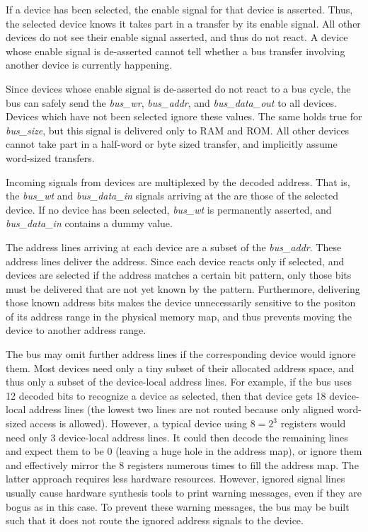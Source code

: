 If a device has been selected, the enable signal for that device is asserted. Thus, the selected device knows it takes part in a transfer by its enable signal. All other devices do not see their enable signal asserted, and thus do not react. A device whose enable signal is de-asserted cannot tell whether a bus transfer involving another device is currently happening.

Since devices whose enable signal is de-asserted do not react to a bus cycle, the bus can safely send the {\it bus\_wr}, {\it bus\_addr}, and {\it bus\_data\_out} to all devices. Devices which have not been selected ignore these values. The same holds true for {\it bus\_size}, but this signal is delivered only to RAM and ROM. All other devices cannot take part in a half-word or byte sized transfer, and implicitly assume word-sized transfers.

Incoming signals from devices are multiplexed by the decoded address. That is, the {\it bus\_wt} and {\it bus\_data\_in} signals arriving at the \eco are those of the selected device. If no device has been selected, {\it bus\_wt} is permanently asserted, and {\it bus\_data\_in} contains a dummy value.

The address lines arriving at each device are a subset of the {\it bus\_addr}. These address lines deliver the  address. Since each device reacts only if selected, and devices are selected if the address matches a certain bit pattern, only those bits must be delivered that are not yet known by the pattern. Furthermore, delivering those known address bits makes the device unnecessarily sensitive to the positon of its address range in the physical memory map, and thus prevents moving the device to another address range.

The bus may omit further address lines if the corresponding device would ignore them. Most devices need only a tiny subset of their allocated address space, and thus only a subset of the device-local address lines. For example, if the bus uses 12 decoded bits to recognize a device as selected, then that device gets 18 device-local address lines (the lowest two lines are not routed because only aligned word-sized access is allowed). However, a typical device using $8=2^3$ registers would need only 3 device-local address lines. It could then decode the remaining lines and expect them to be 0 (leaving a huge hole in the address map), or ignore them and effectively mirror the 8 registers numerous times to fill the address map. The latter approach requires less hardware resources. However, ignored signal lines usually cause hardware synthesis tools to print warning messages, even if they are bogus as in this case. To prevent these warning messages, the bus may be built such that it does not route the ignored address signals to the device.

